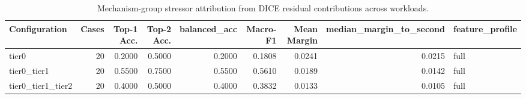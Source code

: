 \begin{table}[t]
\centering
\caption{Mechanism-group stressor attribution from DICE residual contributions across workloads.}
\label{tab:dice_stressor_diagnosis}
\footnotesize
\begin{tabular}{lrrrrrrrl}
\toprule
Configuration & Cases & Top-1 Acc. & Top-2 Acc. & balanced_acc & Macro-F1 & Mean Margin & median_margin_to_second & feature_profile \\
\midrule
tier0 & 20 & 0.2000 & 0.5000 & 0.2000 & 0.1808 & 0.0241 & 0.0215 & full \\
tier0_tier1 & 20 & 0.5500 & 0.7500 & 0.5500 & 0.5610 & 0.0189 & 0.0142 & full \\
tier0_tier1_tier2 & 20 & 0.4000 & 0.5000 & 0.4000 & 0.3832 & 0.0133 & 0.0105 & full \\
\bottomrule
\end{tabular}

\end{table}
